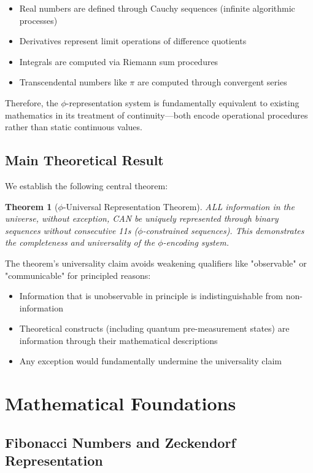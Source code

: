 \documentclass[12pt,letterpaper]{article}
\newtheorem{theorem}{Theorem}[section]
\begin{document}
\begin{itemize}
\item Real numbers are defined through Cauchy sequences (infinite algorithmic processes)
\item Derivatives represent limit operations of difference quotients
\item Integrals are computed via Riemann sum procedures
\item Transcendental numbers like $\pi$ are computed through convergent series
\end{itemize}

Therefore, the $\phi$-representation system is fundamentally equivalent to existing mathematics in its treatment of continuity—both encode operational procedures rather than static continuous values.

\subsection{Main Theoretical Result}

We establish the following central theorem:

\begin{theorem}[$\phi$-Universal Representation Theorem]
\label{thm:universal}
ALL information in the universe, without exception, CAN be uniquely represented through binary sequences without consecutive 11s ($\phi$-constrained sequences). This demonstrates the completeness and universality of the $\phi$-encoding system.
\end{theorem}

The theorem's universality claim avoids weakening qualifiers like "observable" or "communicable" for principled reasons:
\begin{itemize}
\item Information that is unobservable in principle is indistinguishable from non-information
\item Theoretical constructs (including quantum pre-measurement states) are information through their mathematical descriptions
\item Any exception would fundamentally undermine the universality claim
\end{itemize}

\section{Mathematical Foundations}

\subsection{Fibonacci Numbers and Zeckendorf Representation}
\end{document}

